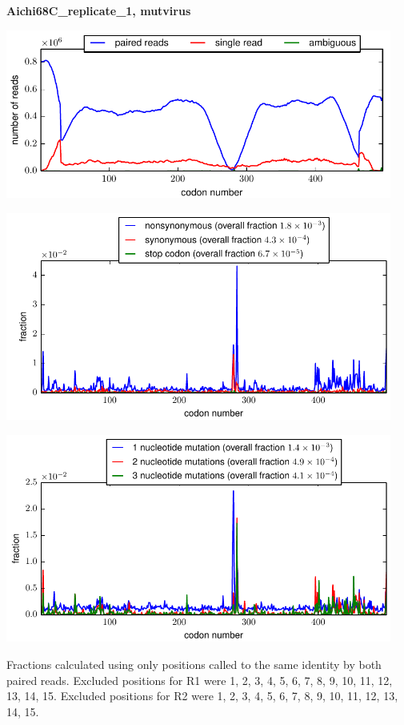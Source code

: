 \documentclass[10pt,letterpaper]{article}
\begin{document}
\centerline{\Large \bf Aichi68C\_replicate\_1, mutvirus}
\vspace{0.1in}

\centerline{\includegraphics[width=5in]{Aichi68C_replicate_1_mutvirus_codondepth.pdf}}
\vspace{0.1in}

\centerline{\includegraphics[width=5in]{Aichi68C_replicate_1_mutvirus_syn-ns-dist.pdf}}
\vspace{0.1in}

\centerline{\includegraphics[width=5in]{Aichi68C_replicate_1_mutvirus_nmutspercodon-dist.pdf}}
\vspace{0.1in}

Fractions calculated using only positions called to the same identity by both paired reads.  Excluded positions for R1 were 1, 2, 3, 4, 5, 6, 7, 8, 9, 10, 11, 12, 13, 14, 15. 
 Excluded positions for R2 were 1, 2, 3, 4, 5, 6, 7, 8, 9, 10, 11, 12, 13, 14, 15. 
\end{document}
